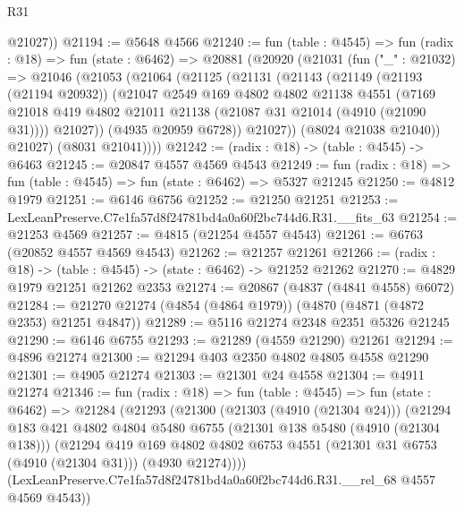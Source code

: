 \begin{lexlean}{R31}
\begin{coremodule}
        @21027))
@21194 := @5648 @4566
@21240 := fun (table : @4545) =>
  fun (radix : @18) =>
  fun (state : @6462) =>
  @20881
    (@20920
      (@21031
        (fun ("_" : @21032) =>
        @21046
          (@21053
            (@21064
              (@21125
                (@21131
                  (@21143
                    (@21149
                      (@21193 (@21194 @20932))
                      (@21047
                        @2549
                        @169
                        @4802
                        @4802
                        @21138
                        @4551
                        (@7169
                          @21018
                          @419
                          @4802
                          @21011
                          @21138
                          (@21087 @31 @21014 (@4910 (@21090 @31))))
                        @21027))
                    (@4935 @20959 @6728))
                  @21027))
              (@8024 @21038 @21040))
            @21027)
          (@8031 @21041))))
@21242 := (radix : @18) -> (table : @4545) -> @6463
@21245 := @20847 @4557 @4569 @4543
@21249 := fun (radix : @18) => fun (table : @4545) => fun (state : @6462) => @5327 @21245
@21250 := @4812 @1979
@21251 := @6146 @6756
@21252 := @21250 @21251
@21253 := LexLeanPreserve.C7e1fa57d8f24781bd4a0a60f2bc744d6.R31.__fits_63
@21254 := @21253 @4569
@21257 := @4815 (@21254 @4557 @4543)
@21261 := @6763 (@20852 @4557 @4569 @4543)
@21262 := @21257 @21261
@21266 := (radix : @18) -> (table : @4545) -> (state : @6462) -> @21252 @21262
@21270 := @4829 @1979 @21251 @21262 @2353
@21274 := @20867 (@4837 (@4841 @4558) @6072)
@21284 := @21270 @21274 (@4854 (@4864 @1979)) (@4870 (@4871 (@4872 @2353) @21251 @4847))
@21289 := @5116 @21274 @2348 @2351 @5326 @21245
@21290 := @6146 @6755
@21293 := @21289 (@4559 @21290) @21261
@21294 := @4896 @21274
@21300 := @21294 @403 @2350 @4802 @4805 @4558 @21290
@21301 := @4905 @21274
@21303 := @21301 @24 @4558
@21304 := @4911 @21274
@21346 := fun (radix : @18) =>
  fun (table : @4545) =>
  fun (state : @6462) =>
  @21284
    (@21293
      (@21300
        (@21303 (@4910 (@21304 @24)))
        (@21294
          @183
          @421
          @4802
          @4804
          @5480
          @6755
          (@21301 @138 @5480 (@4910 (@21304 @138)))
          (@21294
            @419
            @169
            @4802
            @4802
            @6753
            @4551
            (@21301 @31 @6753 (@4910 (@21304 @31)))
            (@4930 @21274))))
      (LexLeanPreserve.C7e1fa57d8f24781bd4a0a60f2bc744d6.R31.__rel_68 @4557 @4569 @4543))

\end{coremodule}
\end{lexlean}
